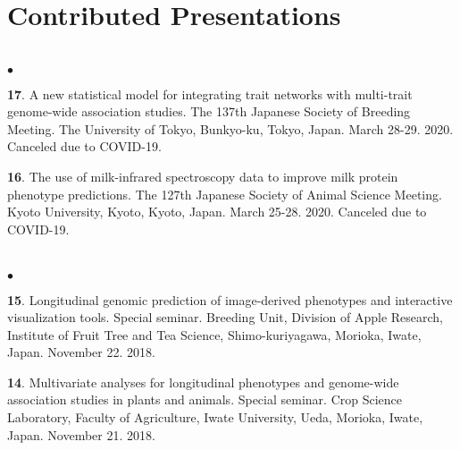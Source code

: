 \documentclass[margin,line,10pt]{res}
\newenvironment{list2}{
  \begin{list}{$\bullet$}{%
      \setlength{\itemsep}{0in}
      \setlength{\parsep}{0in} \setlength{\parskip}{0in}
      \setlength{\topsep}{0in} \setlength{\partopsep}{0in} 
      \setlength{\leftmargin}{0.2in}}}{\end{list}}
\begin{document}
\begin{resume}
\vspace{0.5cm}
\section{\sc Contributed Presentations}
\vspace{1.0cm}

\section{}
\begin{list2}

  \item [{\bf 17}.] A new statistical model for integrating trait networks with multi-trait genome-wide association studies. The 137th Japanese Society of Breeding Meeting. The University of Tokyo, Bunkyo-ku, Tokyo, Japan. March 28-29. 2020. Canceled due to COVID-19.
 
  \vspace{0.5cm}
  
  \item [{\bf 16}.] The use of milk-infrared spectroscopy data to improve milk protein phenotype predictions. The 127th Japanese Society of Animal Science Meeting. Kyoto University, Kyoto, Kyoto, Japan. March 25-28. 2020. Canceled due to COVID-19.
  
\end{list2}  



\section{}
\begin{list2}

\item [{\bf 15}.] Longitudinal genomic prediction of image-derived phenotypes and interactive visualization tools. Special seminar. Breeding Unit, Division of Apple Research, Institute of Fruit Tree and Tea Science, Shimo-kuriyagawa, Morioka, Iwate, Japan. November 22. 2018.
  
  \vspace{0.5cm}
  
\item [{\bf 14}.] Multivariate analyses for longitudinal phenotypes and genome-wide association studies in plants and animals. Special seminar. Crop Science Laboratory, Faculty of Agriculture, Iwate University, Ueda, Morioka, Iwate, Japan. November 21. 2018.
  

\end{list2}
\end{resume}
\end{document}
